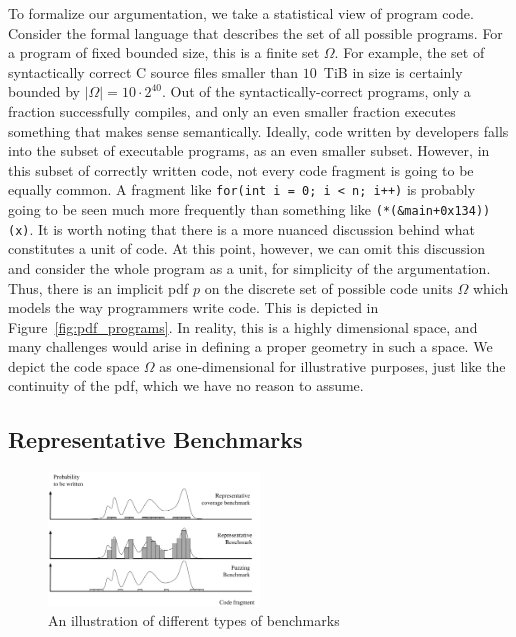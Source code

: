 To formalize our argumentation, we take a statistical view of program code.
Consider the formal language that describes the set of all possible programs.
For a program of fixed bounded size, this is a finite set $\Omega$.
For example, the set of syntactically correct C source files smaller than $10$~TiB in size is certainly bounded by $|\Omega| = 10 \cdot 2^{40}$.
Out of the syntactically-correct programs, only a fraction successfully compiles, and only an even smaller fraction executes something that makes sense semantically.
Ideally, code written by developers falls into the subset of executable programs, as an even smaller subset.
However, in this subset of correctly written code, not every code fragment is going to be equally common.
A fragment like
\texttt{for(int i = 0; i < n; i++)} is probably going to be seen much more frequently than something like \texttt{(*(\&main+0x134))(x)}.
It is worth noting that there is a more nuanced discussion behind what constitutes a unit of code.
At this point, however, we can omit this discussion and consider the whole program as a unit, for simplicity of the argumentation.
Thus, there is an implicit \ac{pdf} $p$ on the discrete set of possible code units $\Omega$ which models the way programmers write code.
This is depicted in Figure~\ref{fig:pdf_programs}.
In reality, this is a highly dimensional space, and many challenges would arise in defining a proper geometry in such a space.
We depict the code space $\Omega$ as one-dimensional for illustrative purposes, just like the continuity of the \ac{pdf}, which we have no reason to assume.

\subsection{Representative Benchmarks}
\label{sec:representative}

\begin{figure}[th]
	\centering
	\includegraphics[width=0.5\textwidth]{figures/benchmark_types.pdf}
	\caption{An illustration of different types of benchmarks}
	\label{fig:benchmark_types}
\end{figure}

